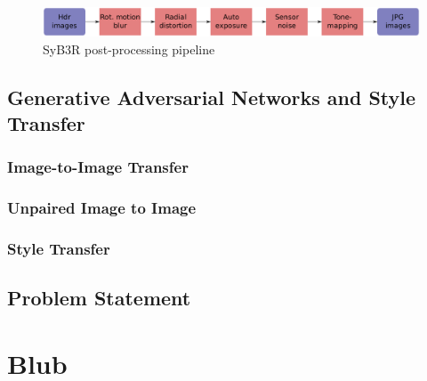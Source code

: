 \documentclass[a4paper,cleardoubleempty,BCOR1cm]{scrbook}
\begin{document}
\begin{figure}[h]
	\centering
	\includegraphics[width=\textwidth]{images/SyB3R_pp.png}
	\caption{SyB3R post-processing pipeline}
	\label{SyB3R_pp}
\end{figure}


\newpage

\section{Generative Adversarial Networks and Style Transfer}
\subsection{Image-to-Image Transfer}
\cite{DBLP:journals/corr/IsolaZZE16}

\newpage

\subsection{Unpaired Image to Image}
\cite{DBLP:journals/corr/ZhuPIE17}

\subsection{Style Transfer}
\cite{DBLP:conf/cvpr/GatysEB16}


\section{Problem Statement}



\appendix
\chapter{Blub}



\end{document}
